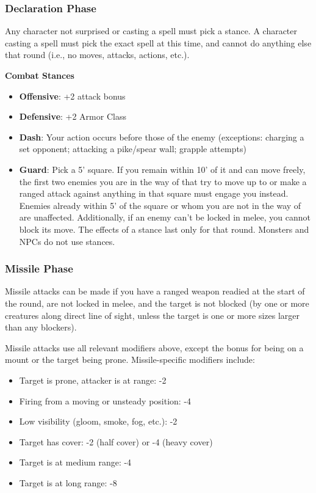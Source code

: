 \documentclass{article}
\begin{document}
\begin{multicols}{2}
\subsubsection{Declaration Phase}\label{declaration-phase}

Any character not surprised or casting a spell must pick a stance. A
character casting a spell must pick the exact spell at this time, and
cannot do anything else that round (i.e., no moves, attacks, actions,
etc.).

\textbf{Combat Stances}

\begin{itemize}
\tightlist
\item
  \textbf{Offensive}: +2 attack bonus
\item
  \textbf{Defensive}: +2 Armor Class
\item
  \textbf{Dash}: Your action occurs before those of the enemy
  (exceptions: charging a set opponent; attacking a pike/spear wall;
  grapple attempts)
\item
  \textbf{Guard}: Pick a 5' square. If you remain within 10' of it and
  can move freely, the first two enemies you are in the way of that try
  to move up to or make a ranged attack against anything in that square
  must engage you instead. Enemies already within 5' of the square or
  whom you are not in the way of are unaffected. Additionally, if an
  enemy can't be locked in melee, you cannot block its move. The effects
  of a stance last only for that round. Monsters and NPCs do not use
  stances.
\end{itemize}

\subsubsection{Missile Phase}\label{missile-phase}

Missile attacks can be made if you have a ranged weapon readied at the
start of the round, are not locked in melee, and the target is not
blocked (by one or more creatures along direct line of sight, unless the
target is one or more sizes larger than any blockers).

Missile attacks use all relevant modifiers above, except the bonus for
being on a mount or the target being prone. Missile-specific modifiers
include:

\begin{itemize}
\tightlist
\item
  Target is prone, attacker is at range: -2
\item
  Firing from a moving or unsteady position: -4
\item
  Low visibility (gloom, smoke, fog, etc.): -2
\item
  Target has cover: -2 (half cover) or -4 (heavy cover)
\item
  Target is at medium range: -4
\item
  Target is at long range: -8
\end{itemize}


\end{multicols}
\end{document}
